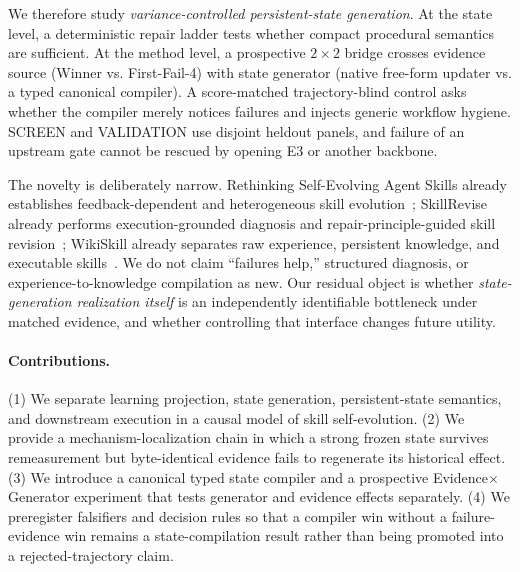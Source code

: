 We therefore study \emph{variance-controlled persistent-state generation}. At the state level, a deterministic repair ladder tests whether compact procedural semantics are sufficient. At the method level, a prospective $2\times2$ bridge crosses evidence source (Winner vs. First-Fail-4) with state generator (native free-form updater vs. a typed canonical compiler). A score-matched trajectory-blind control asks whether the compiler merely notices failures and injects generic workflow hygiene. SCREEN and VALIDATION use disjoint heldout panels, and failure of an upstream gate cannot be rescued by opening E3 or another backbone.

The novelty is deliberately narrow. Rethinking Self-Evolving Agent Skills already establishes feedback-dependent and heterogeneous skill evolution~\citep{liu2026rethinking}; SkillRevise already performs execution-grounded diagnosis and repair-principle-guided skill revision~\citep{liu2026skillrevise}; WikiSkill already separates raw experience, persistent knowledge, and executable skills~\citep{tang2026wikiskill}. We do not claim ``failures help,'' structured diagnosis, or experience-to-knowledge compilation as new. Our residual object is whether \emph{state-generation realization itself} is an independently identifiable bottleneck under matched evidence, and whether controlling that interface changes future utility.

\paragraph{Contributions.}
(1) We separate learning projection, state generation, persistent-state semantics, and downstream execution in a causal model of skill self-evolution. (2) We provide a mechanism-localization chain in which a strong frozen state survives remeasurement but byte-identical evidence fails to regenerate its historical effect. (3) We introduce a canonical typed state compiler and a prospective Evidence$\times$Generator experiment that tests generator and evidence effects separately. (4) We preregister falsifiers and decision rules so that a compiler win without a failure-evidence win remains a state-compilation result rather than being promoted into a rejected-trajectory claim.
